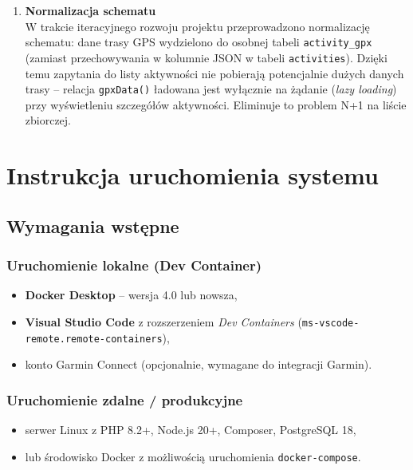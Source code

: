 \documentclass[12pt,a4paper]{report}
\begin{document}
\begin{enumerate}[resume]
\item \textbf{Normalizacja schematu} \\
W trakcie iteracyjnego rozwoju projektu przeprowadzono normalizację schematu: dane trasy GPS wydzielono do osobnej tabeli \texttt{activity\_gpx} (zamiast przechowywania w kolumnie JSON w tabeli \texttt{activities}). Dzięki temu zapytania do listy aktywności nie pobierają potencjalnie dużych danych trasy -- relacja \texttt{gpxData()} ładowana jest wyłącznie na żądanie (\textit{lazy loading}) przy wyświetleniu szczegółów aktywności. Eliminuje to problem N+1 na liście zbiorczej.

\end{enumerate}

\chapter{Instrukcja uruchomienia systemu}
\label{ch:uruchomienie}

\section{Wymagania wstępne}

\subsection{Uruchomienie lokalne (Dev Container)}

\begin{itemize}[noitemsep]
    \item \textbf{Docker Desktop} -- wersja 4.0 lub nowsza,
    \item \textbf{Visual Studio Code} z rozszerzeniem \textit{Dev Containers} (\texttt{ms-vscode-remote.remote-containers}),
    \item konto Garmin Connect (opcjonalnie, wymagane do integracji Garmin).
\end{itemize}

\subsection{Uruchomienie zdalne / produkcyjne}

\begin{itemize}[noitemsep]
    \item serwer Linux z PHP 8.2+, Node.js 20+, Composer, PostgreSQL 18,
    \item lub środowisko Docker z możliwością uruchomienia \texttt{docker-compose}.
\end{itemize}
\end{document}
